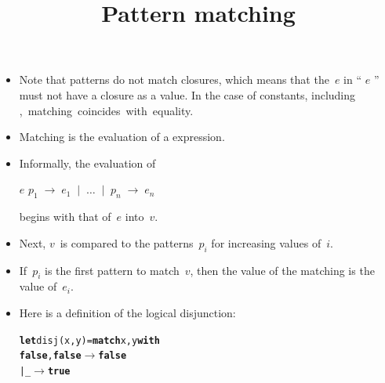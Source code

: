 \documentclass[wide]{slides}
\begin{document}
\begin{slide}
  \title{Pattern matching}

  \begin{itemize}

    \item Note that patterns do not match closures, which means that
      the~\(e\) in ``\Xmatch{} $e$ \Xwith{}'' must not have a closure
      as a value. In the case of constants, including \unit, matching
      coincides with equality.

    \item Matching is the evaluation of a \Xmatch expression.

    \item Informally, the evaluation of
      \begin{center}
        \Xmatch{} $e$ \Xwith{} $p_1 \; \rightarrow \; e_1 \; \mid \;
        \ldots \; \mid \; p_n \; \rightarrow \; e_n$
      \end{center}
      begins with that of~$e$ into~$v$.

    \item Next, \(v\)~is compared to the patterns~\(p_i\) for
      increasing values of~\(i\).

    \item If~\(p_i\) is the first pattern to match~\(v\), then the
      value of the matching is the value of~\(e_i\).

    \item Here is a definition of the logical disjunction:
\begin{alltt}
\textbf{let} disj (x,y) = \textbf{match} x,y \textbf{with}
                      \textbf{false}, \textbf{false} \(\rightarrow\) \textbf{false}
                    | \_ \(\rightarrow\) \textbf{true}
\end{alltt}

  \end{itemize}

\end{slide}
\end{document}
